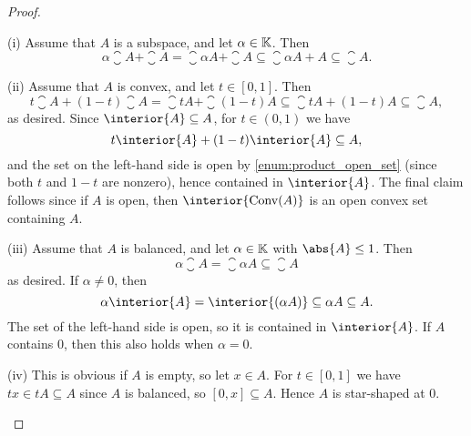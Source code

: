 \documentclass[article, a4paper, 11pt, oneside]{memoir}
\numberwithin{equation}{chapter}
\begin{document}
\begin{proof}
\begin{proofsec}
    \item[(i)]
    Assume that $A$ is a subspace, and let $\alpha \in \mathbb{K}$. Then
    \begin{equation*}
        \alpha \closure{A} + \closure{A}
            = \closure{\alpha A} + \closure{A}
            \subseteq \closure{\alpha A + A}
            \subseteq \closure{A}.
    \end{equation*}
    
    \item[(ii)]
    Assume that $A$ is convex, and let $t \in [0,1]$. Then
    \begin{equation*}
        t \closure{A} + (1-t) \closure{A}
            = \closure{tA} + \closure{(1-t)A}
            \subseteq \closure{tA + (1-t)A}
            \subseteq \closure{A},
    \end{equation*}
    as desired. Since $\interior{A} \subseteq A$, for $t \in (0,1)$ we have
    \begin{equation*}
        t \interior{A} + (1-t) \interior{A}
            \subseteq A,
    \end{equation*}
    and the set on the left-hand side is open by \cref{enum:product_open_set} (since both $t$ and $1-t$ are nonzero), hence contained in $\interior{A}$. The final claim follows since if $A$ is open, then $\interior{\conv(A)}$ is an open convex set containing $A$.

    \item[(iii)]
    Assume that $A$ is balanced, and let $\alpha \in \mathbb{K}$ with $\abs{A} \leq 1$. Then
    \begin{equation*}
        \alpha \closure{A}
            = \closure{\alpha A}
            \subseteq \closure{A}
    \end{equation*}
    as desired. If $\alpha \neq 0$, then
    \begin{equation*}
        \alpha \interior{A}
            = \interior{(\alpha A)}
            \subseteq \alpha A
            \subseteq A.
    \end{equation*}
    The set of the left-hand side is open, so it is contained in $\interior{A}$. If $A$ contains $0$, then this also holds when $\alpha = 0$.

    \item[(iv)]
    This is obvious if $A$ is empty, so let $x \in A$. For $t \in [0,1]$ we have $tx \in tA \subseteq A$ since $A$ is balanced, so $[0,x] \subseteq A$. Hence $A$ is star-shaped at $0$.
    

\end{proofsec}
\end{proof}
\end{document}
